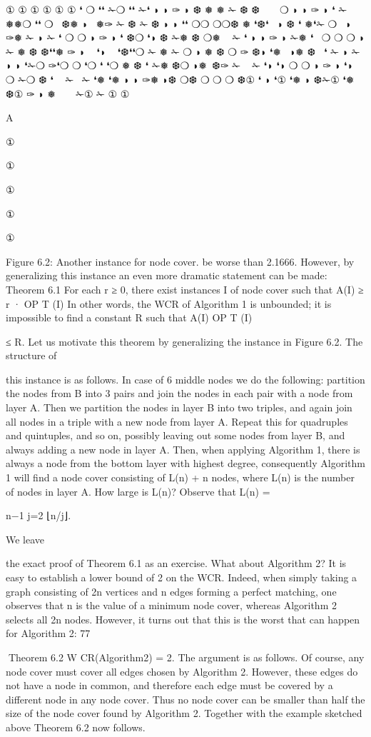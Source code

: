 ①
①
①
①
①
①
❛
❍
❛❛ ✁❍
❛❛ ✁❛
◗
◗
✑
◗
❆
❅
❅
✁
❆
❆
 
 
❍
◗
◗
✑
◗ ❛ ✁ ❅❅❍
❛❛
❍  ❆❅ ◗  ❅✑ ✁ ❆
✁ ❆ ◗
◗ ❛❛ ❍❍
❍❍❆ ❅
❛❆❛  ◗
❆
❛
❅❛✁ ❍
 ◗ ✑❅ ✁
◗
✁
❛
❍
❍
◗
✑
◗
❛ ❆❍ ❛◗
❆
✁❅
❆ ❍❅
 
✁
❛
◗
◗
✑
◗ ✁❅ ❛ 
❍
❍
❍ ◗
✁ ❅ ❆
❆❛❛❅
✑
◗
  ❛◗
  ❛❆❛❛❍
✁ ❅
✁
❍ ◗ ❅ ❆
❍
✑ ❆◗ ❛❅
 ◗❅ ❆  ❛
✁ ◗
✁
◗
◗ ❛✁❍
✑❛❍
❍
❛❍
❛
❛❍
❅ ❆
❛
✁❅
❆❍
◗❅ ❆✑
✁  
✁
❛◗
❛◗
❍
❍
◗
✑
◗
❛◗
❍
✁❍
❆ ❛
 
✁ 
✁
❛❅
❛❅
◗
◗
✑❅
◗❆
❍❆
❍
❍
❍
❆①
❛
◗
❛① ❛❅
◗
❆✁① ❛❅
❆①
✑
◗
❅
 
 
✁①
✁
①
①

A

①

①

①

①

①

Figure 6.2: Another instance for node cover.
be worse than 2.1666. However, by generalizing this instance an even more dramatic statement can be
made:
Theorem 6.1 For each r ≥ 0, there exist instances I of node cover such that A(I) ≥ r · OP T (I)
In other words, the WCR of Algorithm 1 is unbounded; it is impossible to find a constant R such that
A(I)
OP T (I)

≤ R. Let us motivate this theorem by generalizing the instance in Figure 6.2. The structure of

this instance is as follows. In case of 6 middle nodes we do the following: partition the nodes from B into
3 pairs and join the nodes in each pair with a node from layer A. Then we partition the nodes in layer
B into two triples, and again join all nodes in a triple with a new node from layer A. Repeat this for
quadruples and quintuples, and so on, possibly leaving out some nodes from layer B, and always adding
a new node in layer A. Then, when applying Algorithm 1, there is always a node from the bottom layer
with highest degree, consequently Algorithm 1 will find a node cover consisting of L(n) + n nodes, where
L(n) is the number of nodes in layer A. How large is L(n)? Observe that L(n) =

n−1
j=2 ⌊n/j⌋.

We leave

the exact proof of Theorem 6.1 as an exercise.
What about Algorithm 2? It is easy to establish a lower bound of 2 on the WCR. Indeed, when simply
taking a graph consisting of 2n vertices and n edges forming a perfect matching, one observes that n is
the value of a minimum node cover, whereas Algorithm 2 selects all 2n nodes. However, it turns out that
this is the worst that can happen for Algorithm 2:
77

Theorem 6.2 W CR(Algorithm2) = 2.
The argument is as follows. Of course, any node cover must cover all edges chosen by Algorithm 2.
However, these edges do not have a node in common, and therefore each edge must be covered by a
different node in any node cover. Thus no node cover can be smaller than half the size of the node cover
found by Algorithm 2. Together with the example sketched above Theorem 6.2 now follows.


